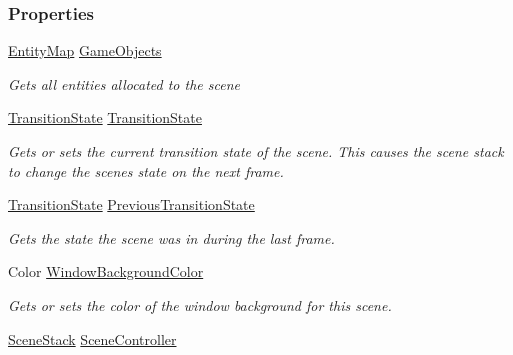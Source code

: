 \subsubsection*{Properties}
\begin{DoxyCompactItemize}
\item 
\hyperlink{class_m_b2_d_1_1_entity_component_1_1_entity_map}{Entity\+Map} \hyperlink{class_m_b2_d_1_1_scenes_1_1_scene_aae9f1aa11591fa124e5da41f53138ea1}{Game\+Objects}
\begin{DoxyCompactList}\small\item\em Gets all entities allocated to the scene \end{DoxyCompactList}\item 
\hyperlink{namespace_m_b2_d_1_1_scenes_a0e0db3f97bbaa272f70534c5954c4acc}{Transition\+State} \hyperlink{class_m_b2_d_1_1_scenes_1_1_scene_a6167906306d4c7d9a7a4fbd6909c9d12}{Transition\+State}
\begin{DoxyCompactList}\small\item\em Gets or sets the current transition state of the scene. This causes the scene stack to change the scenes state on the next frame. \end{DoxyCompactList}\item 
\hyperlink{namespace_m_b2_d_1_1_scenes_a0e0db3f97bbaa272f70534c5954c4acc}{Transition\+State} \hyperlink{class_m_b2_d_1_1_scenes_1_1_scene_ac683a1684a15a3da44197188e13d2c2a}{Previous\+Transition\+State}
\begin{DoxyCompactList}\small\item\em Gets the state the scene was in during the last frame. \end{DoxyCompactList}\item 
Color \hyperlink{class_m_b2_d_1_1_scenes_1_1_scene_abfa7329c484e4af3153469eb278fcb69}{Window\+Background\+Color}
\begin{DoxyCompactList}\small\item\em Gets or sets the color of the window background for this scene. \end{DoxyCompactList}\item 
\hyperlink{class_m_b2_d_1_1_scenes_1_1_scene_stack}{Scene\+Stack} \hyperlink{class_m_b2_d_1_1_scenes_1_1_scene_ad32d9d738f33bd710184f7eda6a43ddf}{Scene\+Controller}

\end{DoxyCompactItemize}

